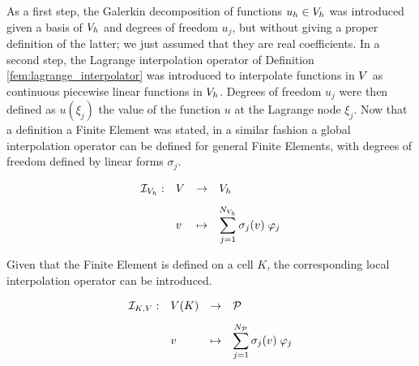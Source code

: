 \medskip
As a first step, the Galerkin decomposition of functions $u_h \in {{V}}_h$ was introduced given a basis of ${{V}}_h$ and degrees of freedom $u_j$, but without giving a proper definition of the latter; we just assumed that they are real coefficients.
In a second step, the Lagrange interpolation operator of Definition \ref{fem:lagrange_interpolator} was introduced to interpolate functions in ${V}$ as continuous piecewise linear functions in ${{V}}_h$.
Degrees of freedom $u_j$ were then defined as $u(\xi_j)$ the value of the function $u$ at the Lagrange node $\xi_j$.
Now that a definition a Finite Element was stated, in a similar fashion a global interpolation operator can be defined for general Finite Elements, \ie with degrees of freedom defined by linear forms $\sigma_j$.

\begin{dfntn}\label{fem:global_interpolator}
\begin{equation*}
\begin{array}{llll}
\Iop{\xVh}: & \xV & \fromto & \xVh\\[2ex]
\hfill    & v    & \mapsto & \displaystyle\sum_{j=1}^{\NxVh} \sigma_j(v)\; \varphi_j
\end{array}
\end{equation*}
\end{dfntn}

Given that the Finite Element is defined on a cell $K$, the corresponding local interpolation operator can be introduced.

\begin{dfntn}
\begin{equation*}
\begin{array}{llll}
\IopK{\xV}: & \xV(K) & \fromto & \SpaceP\\[2ex]
\hfill    & v    & \mapsto & \displaystyle\sum_{j=1}^{N_\SpaceP} \sigma_j(v)\; \varphi_j
\end{array}
\end{equation*}
\end{dfntn}

